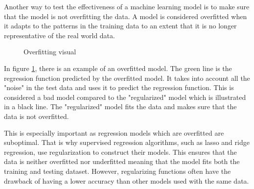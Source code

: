\documentclass[9pt,twocolumn,twoside]{idsi}
\begin{document}
Another way to test the effectiveness of a machine learning model is to make sure that the model is not overfitting the data. A model is considered overfitted when it adapts to the patterns in the training data to an extent that it is no longer representative of the real world data.

\begin{figure}[htbp]
\centering
{}
\caption{Overfitting visual \cite{overfitting_image_bib}}
\label{fig:overfittingImage}
\end{figure}

In figure \ref{fig:overfittingImage}, there is an example of an overfitted model. The green line is the regression function predicted by the overfitted model. It takes into account all the "noise" in the test data and uses it to predict the regression function.  This is considered a bad model compared to the "regularized" model which is illustrated in a black line. The "regularized" model fits the data and makes sure that the data is not overfitted. 

This is especially important as regression models which are overfitted are suboptimal. That is why supervised regression algorithms, such as lasso and ridge regression, use regularization to construct their models. This ensures that the data is neither overfitted nor underfitted meaning that the model fits both the training and testing dataset. However, regularizing functions often have the drawback of having a lower accuracy than other models used with the same data.%
\end{document}
